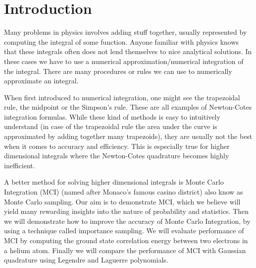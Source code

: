 \section{Introduction}

Many problems in physics involves adding stuff together, usually represented by
computing the integral of some function. Anyone familiar with physics knows that
these integrals often does not lend themselves to nice analytical solutions. In
these cases we have to use a numerical approximation/numerical integration of the integral.  
There are many procedures or rules we can use to numerically approximate an
integral. 

When first introduced to numerical integration, one might see the trapezoidal
rule, the midpoint or the Simpson's rule. These are all examples of
Newton-Cotes integration formulas. While these kind of methods is easy to
intuitively understand (in case of the trapezoidal rule the area under the curve
is approximated by adding together many trapezoids), they are usually not the
best when it comes to accuracy and efficiency. This is especially true for
higher dimensional integrals where the Newton-Cotes quadrature becomes highly
inefficient. 

A better method for solving higher dimensional integrals is Monte Carlo
Integration (MCI) (named after Monaco's famous casino district) also know as
Monte Carlo sampling.  
Our aim is to demonstrate MCI, which we believe will yield
many rewarding insights into the nature of probability and statistics. Then we
will demonstrate how to improve the accuracy of Monte Carlo Integration, by
using a technique called importance sampling. We will evaluate
performance of MCI by computing the ground state correlation
energy between two electrons in a helium atom. Finally we will compare the
performance of MCI with Gaussian quadrature using Legendre and Laguerre
polynomials.   

